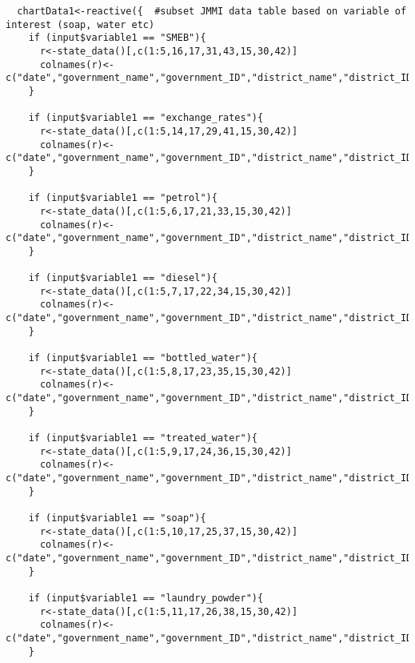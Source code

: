 \documentclass[
]{article}
\begin{document}
\begin{verbatim}
  chartData1<-reactive({  #subset JMMI data table based on variable of interest (soap, water etc)
    if (input$variable1 == "SMEB"){
      r<-state_data()[,c(1:5,16,17,31,43,15,30,42)]
      colnames(r)<-c("date","government_name","government_ID","district_name","district_ID","variableSEL","date2","governorate_val","nat_val","dist_obs","gov_obs","nat_obs")
    }
    
    if (input$variable1 == "exchange_rates"){
      r<-state_data()[,c(1:5,14,17,29,41,15,30,42)]
      colnames(r)<-c("date","government_name","government_ID","district_name","district_ID","variableSEL","date2","governorate_val","nat_val","dist_obs","gov_obs","nat_obs")
    }
    
    if (input$variable1 == "petrol"){
      r<-state_data()[,c(1:5,6,17,21,33,15,30,42)]
      colnames(r)<-c("date","government_name","government_ID","district_name","district_ID","variableSEL","date2","governorate_val","nat_val","dist_obs","gov_obs","nat_obs")
    }
    
    if (input$variable1 == "diesel"){
      r<-state_data()[,c(1:5,7,17,22,34,15,30,42)]
      colnames(r)<-c("date","government_name","government_ID","district_name","district_ID","variableSEL","date2","governorate_val","nat_val","dist_obs","gov_obs","nat_obs")
    }
    
    if (input$variable1 == "bottled_water"){
      r<-state_data()[,c(1:5,8,17,23,35,15,30,42)]
      colnames(r)<-c("date","government_name","government_ID","district_name","district_ID","variableSEL","date2","governorate_val","nat_val","dist_obs","gov_obs","nat_obs")
    }
    
    if (input$variable1 == "treated_water"){
      r<-state_data()[,c(1:5,9,17,24,36,15,30,42)]
      colnames(r)<-c("date","government_name","government_ID","district_name","district_ID","variableSEL","date2","governorate_val","nat_val","dist_obs","gov_obs","nat_obs")
    }
    
    if (input$variable1 == "soap"){
      r<-state_data()[,c(1:5,10,17,25,37,15,30,42)]
      colnames(r)<-c("date","government_name","government_ID","district_name","district_ID","variableSEL","date2","governorate_val","nat_val","dist_obs","gov_obs","nat_obs")
    }
    
    if (input$variable1 == "laundry_powder"){
      r<-state_data()[,c(1:5,11,17,26,38,15,30,42)]
      colnames(r)<-c("date","government_name","government_ID","district_name","district_ID","variableSEL","date2","governorate_val","nat_val","dist_obs","gov_obs","nat_obs")
    }
    

\end{verbatim}
\end{document}
